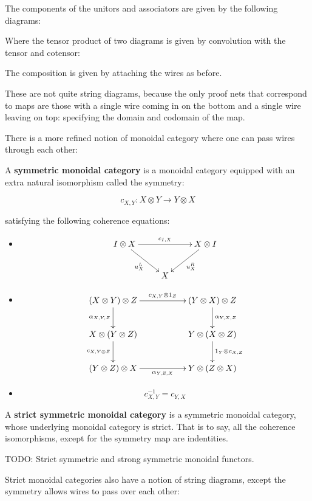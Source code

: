 The components of the unitors and associators are given by the following diagrams:


Where the tensor product of two diagrams is given by convolution with the tensor and cotensor:


The composition is given by attaching the wires as before.

These are not quite string diagrams, because the only proof nets that correspond to maps are those with a single wire coming in on the bottom and a single wire leaving on top: specifying the domain and codomain of the map.


There is a more refined notion of monoidal category where one can pass wires through each other:

\begin{definition}
A {\bf symmetric monoidal category} is a monoidal category equipped with an extra natural isomorphism called the symmetry:

$$
c_{X,Y}:X\otimes Y \to Y\otimes X
$$

satisfying the following coherence equations:

\begin{itemize}
\item
$$
\xymatrix{
I \otimes X \ar[rr]^{c_{I,X}} \ar[rd]_{u^L_X} && X \otimes I \ar[ld]^{u^R_X} \\
& X &
}
$$

\item
$$
\xymatrix{
  (X\otimes Y)\otimes Z \ar[rr]^{c_{X,Y}\otimes 1_Z} \ar[d]_{\alpha_{X,Y,Z}}
    &
    &  (Y\otimes X)\otimes Z \ar[d]^{\alpha_{Y,X,Z}}
  \\X\otimes(Y\otimes Z) \ar[d]_{c_{X,Y\otimes Z}}
    &
    &  Y\otimes(X\otimes Z) \ar[d]^{1_Y\otimes c_{X,Z}}
  \\ (Y\otimes Z)\otimes X \ar[rr]_{\alpha_{Y,Z,X}}
    &
    & Y\otimes (Z\otimes X)
}
$$

\item
$$c_{X,Y}^{-1}= c_{Y,X}$$
\end{itemize}

A {\bf strict symmetric monoidal category} is a symmetric monoidal category, whose underlying monoidal category is strict. That is to say, all the coherence isomorphisms, except for the symmetry map are indentities.

TODO: Strict symmetric and strong symmetric monoidal functors.
\end{definition}

Strict monoidal categories also have a notion of string diagrams, except the symmetry allows wires to pass over each other:

